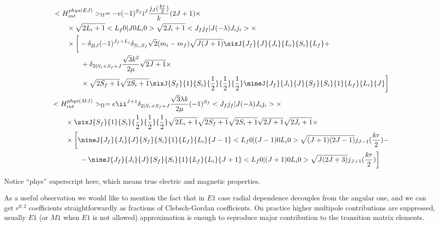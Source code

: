 \begin{align}
    \begin{split}
        &<H_{int}^{phys (EJ)}>_\Omega = -e (-1)^{S_f} \mathrm{i}^{J} \frac{j_J(\frac{k r}{2})}{k} (2J+1) \times \\
        &\qquad\times \sqrt{2L_i + 1} <L_f 0 | J 0 L_i 0> \sqrt{2J_i + 1} <J_f j_f | J (-\lambda) J_i j_i> \times \\
        &\qquad\times \bigg[ -\delta_{2 \nmid J} (-1)^{J_f + L_i} \delta_{S_i, S_f} \sqrt{2}(m_i - m_f) \sqrt{J(J+1)} \sixJ{J_f}{J}{J_i}{L_i}{S_i}{L_f} +\\
        &\qquad\qquad+ \delta_{2 \nmid S_i + S_f + J} \frac{\sqrt{3} k^2}{2 \mu} \sqrt{2J+1} \times \\
        &\qquad\qquad\times \sqrt{2S_f+1} \sqrt{2S_i+1} \sixJ{S_f}{1}{S_i}{\frac{1}{2}}{\frac{1}{2}}{\frac{1}{2}} \nineJ{J_f}{J_i}{J}{S_f}{S_i}{1}{L_f}{L_i}{J} \bigg]
    \end{split} \\
    \begin{split}
        &<H_{int}^{phys (MJ)}>_\Omega = e \ii^{J+1} \delta_{2 \mid S_i+S_f+J} \frac{\sqrt{3} \lambda k}{2 \mu} (-1)^{S_f} <J_f j_f | J (-\lambda) J_i j_i> \times \\
        &\qquad\times \sixJ{S_f}{1}{S_i}{\frac{1}{2}}{\frac{1}{2}}{\frac{1}{2}} \sqrt{2L_i+1} \sqrt{2S_f+1} \sqrt{2S_i+1} \sqrt{2J+1} \sqrt{2J_i + 1} \times\\
        &\qquad\times \bigg[ \nineJ{J_f}{J_i}{J}{S_f}{S_i}{1}{L_f}{L_i}{J-1} <L_f 0 | (J-1) 0 L_i 0> \sqrt{(J+1)(2J-1)} j_{J-1}(\frac{kr}{2}) - \\
        &\qquad\qquad- \nineJ{J_f}{J_i}{J}{S_f}{S_i}{1}{L_f}{L_i}{J+1} <L_f 0 | (J+1) 0 L_i 0> \sqrt{J(2J+3)} j_{J+1}(\frac{kr}{2}) \bigg]
    \end{split}
\end{align}

Notice ``phys'' superscript here, which means true electric and magnetic properties.

As a useful observation we would like to mention the fact that in $E1$ case radial dependence decouples from the angular one, and we can get $r^{0,2}$ coefficients straightforwardly as fractions of Clebsch-Gordan coefficients. On practice higher multipole contributions are suppressed, usually $E1$ (or $M1$ when $E1$ is not allowed) approximation is enough to reproduce major contribution to the transition matrix elements.
